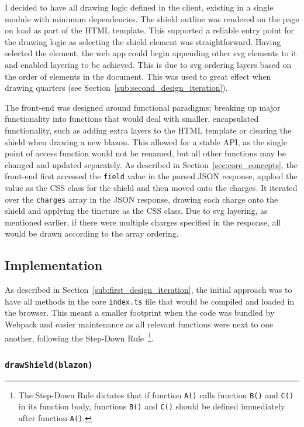 \documentclass[nobib, a4paper, twoside, justified]{tufte-book}
\makeatletter
\newcommand{\svg}{\gls{svg}\@\xspace}
\newcommand{\charge}{\gls{charge}\@\xspace}
\newcommand{\charges}{\glspl{charge}\@\xspace}
\newcommand{\blazon}{\gls{blazon}\@\xspace}
\makeatother
\begin{document}
I decided to have all drawing logic defined in the client, existing in a single module with minimum
dependencies. The shield outline was rendered on the page on load as part of the HTML template.
This supported a reliable entry point for the drawing logic as selecting the shield element was
straightforward. Having selected the element, the web app could begin appending other \svg elements
to it and enabled layering to be achieved. This is due to \svg ordering layers based on the order
of elements in the document. This was used to great effect when drawing quarters (see
Section~\ref{sub:second_design_iteration}).

The front-end was designed around functional paradigms; breaking up major functionality into
functions that would deal with smaller, encapsulated functionality, such as adding extra layers to
the HTML template or clearing the shield when drawing a new \blazon. This allowed for a stable API,
as the single point of access function would not be renamed, but all other functions may be changed
and updated separately. As described in Section~\ref{sec:core_concepts}, the front-end first
accessed the \texttt{field} value in the parsed JSON response, applied the value as the CSS class
for the shield and then moved onto the \charges. It iterated over the \texttt{\charges} array in
the JSON response, drawing each \charge onto the shield and applying the tincture as the CSS class.
Due to \svg layering, as mentioned earlier, if there were multiple \charges specified in the
response, all would be drawn according to the array ordering.

\subsection{Implementation}%
\label{sub:first_design_implementation}

As described in Section~\ref{sub:first_design_iteration}, the initial approach was to have all methods in
the core \texttt{index.ts} file that would be compiled and loaded in the browser. This
meant a smaller footprint when the code was bundled by Webpack and easier maintenance as all
relevant functions were next to one another, following the Step-Down
Rule~\autocite{martin2009clean}\footnote{The Step-Down Rule dictates that if function \texttt{A()}
calls function \texttt{B()} and \texttt{C()} in its function body, functions \texttt{B()} and
\texttt{C()} should be defined immediately after function \texttt{A()}.}.

\subsubsection{\texttt{drawShield(\blazon)}}%
\label{ssub:draw_shield}
\end{document}
